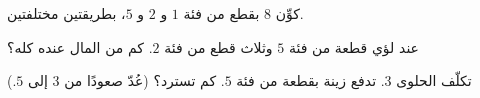 \begin{exercise}[$\star$]\label{exo:g1:measure:7}
كوِّن $8$ بقطع من فئة $1$ و $2$ و $5$، بطريقتين مختلفتين.
\end{exercise}

\begin{exercise}[$\star$]\label{exo:g1:measure:8}
عند لؤي قطعة من فئة $5$ وثلاث قطع من فئة $2$. كم من المال عنده
كله؟
\end{exercise}

\begin{exercise}[$\star\star$]\label{exo:g1:measure:9}
تكلّف الحلوى $3$. تدفع زينة بقطعة من فئة $5$. كم تسترد؟ (عُدّ
صعودًا من $3$ إلى $5$.)
\end{exercise}
